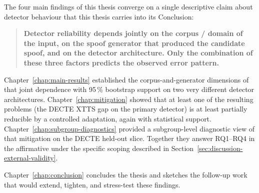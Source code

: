 The four main findings of this thesis converge on a single
descriptive claim about detector behaviour that this thesis
carries into its Conclusion:

\begin{quote}
\textbf{Detector reliability depends jointly on the corpus / domain
of the input, on the spoof generator that produced the
candidate spoof, and on the detector architecture. Only
the combination of these three factors predicts the observed
error pattern.}
\end{quote}

Chapter~\ref{chap:main-results} established the corpus-and-generator dimensions of that
joint dependence with 95\,\% bootstrap support on two very
different detector architectures. Chapter~\ref{chap:mitigation} showed that at least
one of the resulting problems (the DECTE XTTS gap on the primary
detector) is at least partially reducible by a controlled
adaptation, again with statistical support. Chapter~\ref{chap:subgroup-diagnostics} provided a
subgroup-level diagnostic view of that mitigation on the DECTE
held-out slice. Together they answer RQ1--RQ4 in the affirmative
under the specific scoping described in Section~\ref{sec:discussion-external-validity}.

Chapter~\ref{chap:conclusion} concludes the thesis and sketches the follow-up work
that would extend, tighten, and stress-test these findings.
